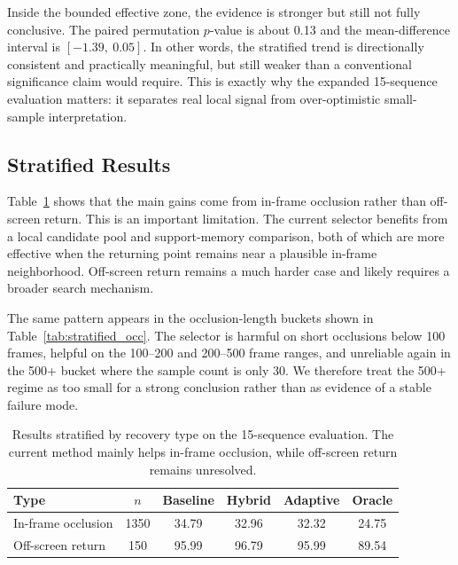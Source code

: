 \documentclass[10pt,journal,compsoc]{IEEEtran}
\begin{document}
Inside the bounded effective zone, the evidence is stronger but still not fully conclusive. The paired permutation $p$-value is about 0.13 and the mean-difference interval is $[-1.39,\ 0.05]$. In other words, the stratified trend is directionally consistent and practically meaningful, but still weaker than a conventional significance claim would require. This is exactly why the expanded 15-sequence evaluation matters: it separates real local signal from over-optimistic small-sample interpretation.

\subsection{Stratified Results}

Table~\ref{tab:stratified_type} shows that the main gains come from in-frame occlusion rather than off-screen return. This is an important limitation. The current selector benefits from a local candidate pool and support-memory comparison, both of which are more effective when the returning point remains near a plausible in-frame neighborhood. Off-screen return remains a much harder case and likely requires a broader search mechanism.

The same pattern appears in the occlusion-length buckets shown in Table~\ref{tab:stratified_occ}. The selector is harmful on short occlusions below 100 frames, helpful on the 100--200 and 200--500 frame ranges, and unreliable again in the 500+ bucket where the sample count is only 30. We therefore treat the 500+ regime as too small for a strong conclusion rather than as evidence of a stable failure mode.

\begin{table}[t]
    \centering
    \caption{Results stratified by recovery type on the 15-sequence evaluation. The current method mainly helps in-frame occlusion, while off-screen return remains unresolved.}
    \label{tab:stratified_type}
    \setlength{\tabcolsep}{4pt}
    \begin{tabular}{lccccc}
        \toprule
        Type & $n$ & Baseline & Hybrid & Adaptive & Oracle \\
        \midrule
        In-frame occlusion & 1350 & 34.79 & 32.96 & 32.32 & 24.75 \\
        Off-screen return & 150 & 95.99 & 96.79 & 95.99 & 89.54 \\
        \bottomrule
    \end{tabular}
\end{table}
\end{document}
